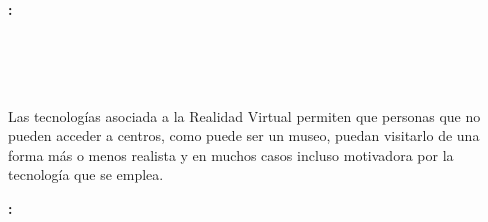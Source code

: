 \chapter*{}



\cleardoublepage
\thispagestyle{empty}

\copyrightpage

\begin{center}
{\large\bfseries \myTitle: \mySubtitle}\\
\end{center}

\begin{center}
\myName \\
\end{center}

\vspace{0.7cm}
\\

\vspace{0.7cm}
\\

Las tecnologías asociada a la Realidad Virtual permiten que personas que no pueden acceder a centros, como puede ser un museo, puedan visitarlo de una forma más o menos realista y en muchos casos incluso motivadora por la tecnología que se emplea.

\thispagestyle{empty}

\cleardoublepage

\begin{center}
	{\large\bfseries \myTitle: \myEnglishSubtitle}\\
\end{center}

\begin{center}
	\myName \\
\end{center}

\vspace{0.7cm}
\\

\vspace{0.7cm}
\\






